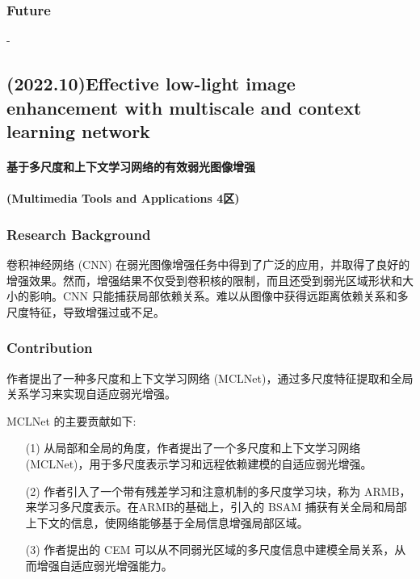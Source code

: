 \documentclass[a4paper]{ctexart}
\begin{document}
	\subsubsection{Future}
	
	-
	
	\subsection{(2022.10)Effective low-light image enhancement with multiscale and context learning network}
	
	\paragraph{基于多尺度和上下文学习网络的有效弱光图像增强}
	
	\paragraph{(Multimedia Tools and Applications 4区)}
	
	\subsubsection{Research Background}
	
	卷积神经网络 (CNN) 在弱光图像增强任务中得到了广泛的应用，并取得了良好的增强效果。然而，增强结果不仅受到卷积核的限制，而且还受到弱光区域形状和大小的影响。CNN 只能捕获局部依赖关系。难以从图像中获得远距离依赖关系和多尺度特征，导致增强过或不足。
	
	\subsubsection{Contribution}
	
	作者提出了一种多尺度和上下文学习网络 (MCLNet)，通过多尺度特征提取和全局关系学习来实现自适应弱光增强。
	
	MCLNet 的主要贡献如下:
	
	\begin{itemize}
		\item[(1)] 
		从局部和全局的角度，作者提出了一个多尺度和上下文学习网络 (MCLNet)，用于多尺度表示学习和远程依赖建模的自适应弱光增强。
		
		\item[(2)]
		作者引入了一个带有残差学习和注意机制的多尺度学习块，称为 ARMB，来学习多尺度表示。在ARMB的基础上，引入的 BSAM 捕获有关全局和局部上下文的信息，使网络能够基于全局信息增强局部区域。
		
		\item[(3)]
		作者提出的 CEM 可以从不同弱光区域的多尺度信息中建模全局关系，从而增强自适应弱光增强能力。
		
	\end{itemize}	
	
\end{document}
